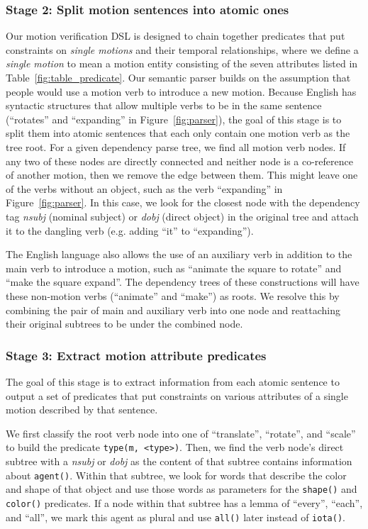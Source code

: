 \subsubsection{Stage 2: Split motion sentences into atomic ones}
Our motion verification DSL is designed to chain together predicates that put constraints on \textit{single motions} and their temporal relationships, where we define a \textit{single motion} to mean a motion entity consisting of the seven attributes listed in Table~\ref{fig:table_predicate}.
%
Our semantic parser builds on the assumption that people would use a motion verb to introduce a new motion. 
Because English has syntactic structures that allow multiple verbs to be in the same sentence (``rotates'' and ``expanding'' in Figure~\ref{fig:parser}), the goal of this stage is to split them into atomic sentences that each only contain one motion verb as the tree root.
%
For a given dependency parse tree, we find all motion verb nodes.
If any two of these nodes are directly connected and neither node is a co-reference of another motion, then we remove the edge between them.
This might leave one of the verbs without an object, such as the verb ``expanding'' in Figure~\ref{fig:parser}.
In this case, we look for the closest node with the dependency tag \textit{nsubj} (nominal subject) or \textit{dobj} (direct object) in the original tree and attach it to the dangling verb (e.g. adding ``it'' to ``expanding'').

The English language also allows the use of an auxiliary verb in addition to the main verb to introduce a motion, such as “animate the square to rotate” and “make the square expand”.
The dependency trees of these constructions will have these non-motion verbs (``animate'' and ``make'') as roots.
We resolve this by combining the pair of main and auxiliary verb into one node and reattaching their original subtrees to be under the combined node.

\subsubsection{Stage 3: Extract motion attribute predicates}
The goal of this stage is to extract information from each atomic sentence to output a set of predicates that put constraints on various attributes of a single motion described by that sentence.

We first classify the root verb node into one of ``translate'', ``rotate'', and ``scale'' to build the predicate \texttt{type(m, <type>)}.
Then, we find the verb node's direct subtree with a \textit{nsubj} or \textit{dobj} as the content of that subtree contains information about \texttt{agent()}.
Within that subtree, we look for words that describe the color and shape of that object and use those words as parameters for the \texttt{shape()} and \texttt{color()} predicates.
If a node within that subtree has a lemma of ``every'', ``each'', and ``all'', we mark this agent as plural and use \texttt{all()} later instead of \texttt{iota()}.


